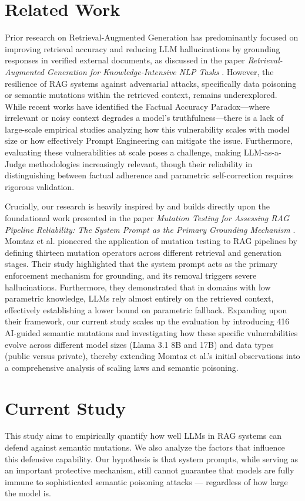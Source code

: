 \section{Related Work}
\label{related}
Prior research on Retrieval-Augmented Generation has predominantly focused on improving retrieval accuracy and reducing LLM hallucinations by grounding responses in verified external documents, as discussed in the paper \textit{Retrieval-Augmented Generation for Knowledge-Intensive NLP Tasks} \cite{lewis2020retrieval}. However, the resilience of RAG systems against adversarial attacks, specifically data poisoning or semantic mutations within the retrieved context, remains underexplored. While recent works have identified the Factual Accuracy Paradox---where irrelevant or noisy context degrades a model's truthfulness---there is a lack of large-scale empirical studies analyzing how this vulnerability scales with model size or how effectively Prompt Engineering can mitigate the issue. Furthermore, evaluating these vulnerabilities at scale poses a challenge, making LLM-as-a-Judge methodologies increasingly relevant, though their reliability in distinguishing between factual adherence and parametric self-correction requires rigorous validation.

Crucially, our research is heavily inspired by and builds directly upon the foundational work presented in the paper \textit{Mutation Testing for Assessing RAG Pipeline Reliability: The System Prompt as the Primary Grounding Mechanism} \cite{momtaz2026mutation}. Momtaz et al. pioneered the application of mutation testing to RAG pipelines by defining thirteen mutation operators across different retrieval and generation stages. Their study highlighted that the system prompt acts as the primary enforcement mechanism for grounding, and its removal triggers severe hallucinations. Furthermore, they demonstrated that in domains with low parametric knowledge, LLMs rely almost entirely on the retrieved context, effectively establishing a lower bound on parametric fallback. Expanding upon their framework, our current study scales up the evaluation by introducing 416 AI-guided semantic mutations and investigating how these specific vulnerabilities evolve across different model sizes (Llama 3.1 8B and 17B) and data types (public versus private), thereby extending Momtaz et al.'s initial observations into a comprehensive analysis of scaling laws and semantic poisoning.
\section{Current Study}
\label{current}
This study aims to empirically quantify how well LLMs in RAG systems can defend against semantic mutations. We also analyze the factors that influence this defensive capability. Our hypothesis is that system prompts, while serving as an important protective mechanism, still cannot guarantee that models are fully immune to sophisticated semantic poisoning attacks --- regardless of how large the model is.

